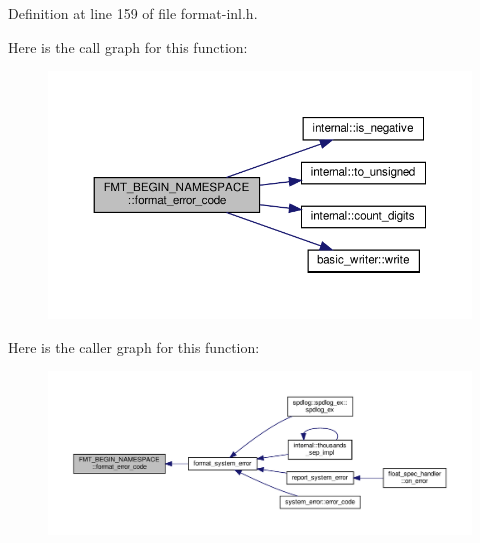 Definition at line 159 of file format-\/inl.\+h.

Here is the call graph for this function\+:
\nopagebreak
\begin{figure}[H]
\begin{center}
\leavevmode
\includegraphics[width=350pt]{namespace_f_m_t___b_e_g_i_n___n_a_m_e_s_p_a_c_e_ad71fe6b856abb34c3351b17daaaae709_cgraph}
\end{center}
\end{figure}
Here is the caller graph for this function\+:
\nopagebreak
\begin{figure}[H]
\begin{center}
\leavevmode
\includegraphics[width=350pt]{namespace_f_m_t___b_e_g_i_n___n_a_m_e_s_p_a_c_e_ad71fe6b856abb34c3351b17daaaae709_icgraph}
\end{center}
\end{figure}
\mbox{\label{namespace_f_m_t___b_e_g_i_n___n_a_m_e_s_p_a_c_e_a9a8134e5f6a1fb2e4fca1b8efdbb3927}} 
